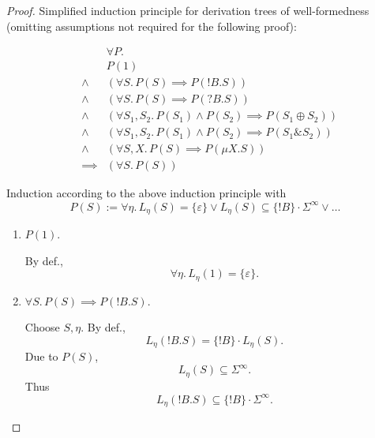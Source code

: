 \documentclass{llncs}
\newcommand*{\send}{\mathord{!}}
\newcommand*{\recv}{\mathord{?}}
\newcommand*{\echoice}{\oplus}
\newcommand*{\ichoice}{\mathop{\&}}
\newcommand*{\concat}{\cdot}
\renewcommand*{\|}{\;|\;}
\renewcommand*{\epsilon}{\varepsilon}
\begin{document}
\begin{proof}
  Simplified induction principle for derivation trees of well-formedness
  (omitting assumptions not required for the following proof):

  \begin{eqnarray*}
    &&      \forall P. \\
    &&      P(1) \\
    &\land& (\forall S.\, P(S) \implies P(\send B.S)) \\
    &\land& (\forall S.\, P(S) \implies P(\recv B.S)) \\
    &\land& (\forall S_1, S_2.\, P(S_1) \land P(S_2) \implies P(S_1 \echoice S_2)) \\
    &\land& (\forall S_1, S_2.\, P(S_1) \land P(S_2) \implies P(S_1 \ichoice   S_2)) \\
    &\land& (\forall S, X.\, P(S) \implies P(\mu X.S)) \\
    &\implies& (\forall S.\, P(S))
  \end{eqnarray*}

  Induction according to the above induction principle with
  \begin{equation*}
    P(S) := \forall \eta.\, L_\eta(S) = \{\epsilon\} \lor L_\eta(S) \subseteq
            \{\send B\} \concat \Sigma^\infty \lor \dots
  \end{equation*}

  \begin{enumerate}
    \item
      \label{case:struct_trace_langs:1}
      $P(1)$.

      By def.,
      \begin{equation*}
        \forall \eta.\, L_\eta(1) = \{\epsilon\}.
      \end{equation*}

    \item
      \label{case:struct_trace_langs:send}
      $\forall S.\, P(S) \implies P(\send B.S)$.

      Choose $S, \eta$. By def.,
      \begin{equation*}
        L_\eta(\send B.S) = \{\send B\} \concat L_\eta(S).
      \end{equation*}
      Due to $P(S)$,
      \begin{equation*}
        L_\eta(S) \subseteq \Sigma^\infty.
      \end{equation*}
      Thus
      \begin{equation*}
        L_\eta(\send B.S) \subseteq \{\send B\} \concat \Sigma^\infty.
      \end{equation*}


\end{enumerate}
\end{proof}
\end{document}
